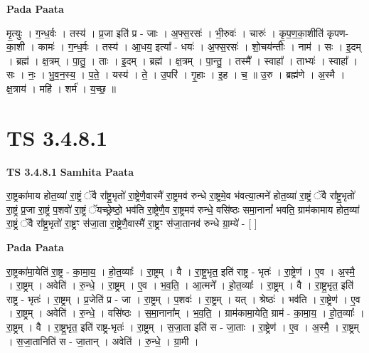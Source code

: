 \documentclass[17pt]{extarticle}
\begin{document}
\textbf{Pada Paata} \newline

मृ॒त्युः । ग॒न्ध॒र्वः । तस्य॑ । प्र॒जा इति॑ प्र - जाः । अ॒फ्स॒रसः॑ । भी॒रुवः॑ । चारुः॑ । कृ॒प॒ण॒का॒शीति॑ कृपण-का॒शी । कामः॑ । ग॒न्ध॒र्वः । तस्य॑ । आ॒धय॒ इत्या᳚ - धयः॑ । अ॒फ्स॒रसः॑ । शो॒चय॑न्तीः । नाम॑ । सः । इ॒दम् । ब्रह्म॑ । क्ष॒त्रम् । पा॒तु॒ । ताः । इ॒दम् । ब्रह्म॑ । क्ष॒त्रम् । पा॒न्तु॒ । तस्मै᳚ । स्वाहा᳚ । ताभ्यः॑ । स्वाहा᳚ । सः । नः॒ । भु॒व॒न॒स्य॒ । प॒ते॒ । यस्य॑ । ते॒ । उ॒परि॑ । गृ॒हाः । इ॒ह । च॒ ॥ उ॒रु । ब्रह्म॑णे । अ॒स्मै । क्ष॒त्राय॑ । महि॑ । शर्म॑ । य॒च्छ॒ ॥  \newline





\section{ TS 3.4.8.1 }

\textbf{TS 3.4.8.1 } \newline
\textbf{Samhita Paata} \newline

रा॒ष्ट्रका॑माय होत॒व्या॑ रा॒ष्ट्रं ॅवै रा᳚ष्ट्र॒भृतो॑ रा॒ष्ट्रेणै॒वास्मै॑ रा॒ष्ट्रमव॑ रुन्धे रा॒ष्ट्रमे॒व भ॑वत्या॒त्मने॑ होत॒व्या॑ रा॒ष्ट्रं ॅवै रा᳚ष्ट्र॒भृतो॑ रा॒ष्ट्रं प्र॒जा रा॒ष्ट्रं प॒शवो॑ रा॒ष्ट्रं ॅयच्छ्रेष्ठो॒ भव॑ति रा॒ष्ट्रेणै॒व रा॒ष्ट्रमव॑ रुन्धे॒ वसि॑ष्ठः समा॒नानां᳚ भवति॒ ग्राम॑कामाय होत॒व्या॑ रा॒ष्ट्रं ॅवै रा᳚ष्ट्र॒भृतो॑ रा॒ष्ट्रꣳ स॑जा॒ता रा॒ष्ट्रेणै॒वास्मै॑ रा॒ष्ट्रꣳ स॑जा॒तानव॑ रुन्धे ग्रा॒म्ये॑ - [  ] \newline

\textbf{Pada Paata} \newline

रा॒ष्ट्रका॑मा॒येति॑ रा॒ष्ट्र - का॒मा॒य॒ । हो॒त॒व्याः᳚ । रा॒ष्ट्रम् । वै । रा॒ष्ट्र॒भृत॒ इति॑ राष्ट्र - भृतः॑ । रा॒ष्ट्रेण॑ । ए॒व । अ॒स्मै॒ । रा॒ष्ट्रम् । अवेति॑ । रु॒न्धे॒ । रा॒ष्ट्रम् । ए॒व । भ॒व॒ति॒ । आ॒त्मने᳚ । हो॒त॒व्याः᳚ । रा॒ष्ट्रम् । वै । रा॒ष्ट्र॒भृत॒ इति॑ राष्ट्र - भृतः॑ । रा॒ष्ट्रम् । प्र॒जेति॑ प्र - जा । रा॒ष्ट्रम् । प॒शवः॑ । रा॒ष्ट्रम् । यत् । श्रेष्ठः॑ । भव॑ति । रा॒ष्ट्रेण॑ । ए॒व । रा॒ष्ट्रम् । अवेति॑ । रु॒न्धे॒ । वसि॑ष्ठः । स॒मा॒नाना᳚म् । भ॒व॒ति॒ । ग्राम॑कामा॒येति॒ ग्राम॑ - का॒मा॒य॒ । हो॒त॒व्याः᳚ । रा॒ष्ट्रम् । वै । रा॒ष्ट्र॒भृत॒ इति॑ राष्ट्र-भृतः॑ । रा॒ष्ट्रम् । स॒जा॒ता इति॑ स - जा॒ताः । रा॒ष्ट्रेण॑ । ए॒व । अ॒स्मै॒ । रा॒ष्ट्रम् । स॒जा॒तानिति॑ स - जा॒तान् । अवेति॑ । रु॒न्धे॒ । ग्रा॒मी ।  \newline
\end{document}
